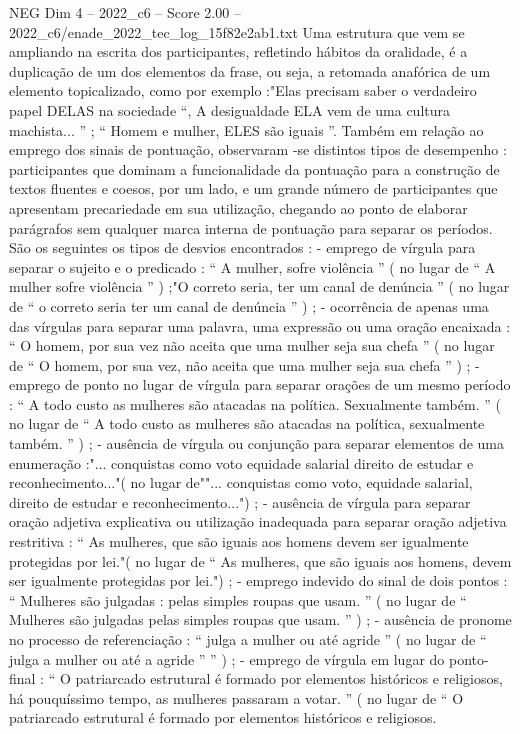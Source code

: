 \begin{textsample}{NEG Dim 4 – 2022\_c6 – Score 2.00 – 2022\_c6/enade\_2022\_tec\_log\_15f82e2ab1.txt}
Uma estrutura que vem se ampliando na escrita dos participantes, refletindo hábitos da oralidade, é a duplicação de um dos elementos da frase, ou seja, a retomada anafórica de um elemento topicalizado, como por exemplo :"Elas precisam saber o verdadeiro papel DELAS na sociedade “, A desigualdade ELA vem de uma cultura machista... ” ; “ Homem e mulher, ELES são iguais ”.
Também em relação ao emprego dos sinais de pontuação, observaram -se distintos tipos de desempenho : participantes que dominam a funcionalidade da pontuação para a construção de textos fluentes e coesos, por um lado, e um grande número de participantes que apresentam precariedade em sua utilização, chegando ao ponto de elaborar parágrafos sem qualquer marca interna de pontuação para separar os períodos.
São os seguintes os tipos de desvios encontrados : - emprego de vírgula para separar o sujeito e o predicado : “ A mulher, sofre violência ” ( no lugar de “ A mulher sofre violência ” ) ;"O correto seria, ter um canal de denúncia ” ( no lugar de “ o correto seria ter um canal de denúncia ” ) ; - ocorrência de apenas uma das vírgulas para separar uma palavra, uma expressão ou uma oração encaixada : “ O homem, por sua vez não aceita que uma mulher seja sua chefa ” ( no lugar de “ O homem, por sua vez, não aceita que uma mulher seja sua chefa ” ) ; - emprego de ponto no lugar de vírgula para separar orações de um mesmo período : “ A todo custo as mulheres são atacadas na política.
Sexualmente também. ” ( no lugar de “ A todo custo as mulheres são atacadas na política, sexualmente também. ” ) ; - ausência de vírgula ou conjunção para separar elementos de uma enumeração :"... conquistas como voto equidade salarial direito de estudar e reconhecimento..."( no lugar de""... conquistas como voto, equidade salarial, direito de estudar e reconhecimento...") ; - ausência de vírgula para separar oração adjetiva explicativa ou utilização inadequada para separar oração adjetiva restritiva : “ As mulheres, que são iguais aos homens devem ser igualmente protegidas por lei."( no lugar de “ As mulheres, que são iguais aos homens, devem ser igualmente protegidas por lei.") ; - emprego indevido do sinal de dois pontos : “ Mulheres são julgadas : pelas simples roupas que usam. ” ( no lugar de “ Mulheres são julgadas pelas simples roupas que usam. ” ) ; - ausência de pronome no processo de referenciação : “ julga a mulher ou até agride ” ( no lugar de “ julga a mulher ou até a agride ” ” ) ; - emprego de vírgula em lugar do ponto-final : “ O patriarcado estrutural é formado por elementos históricos e religiosos, há pouquíssimo tempo, as mulheres passaram a votar. ” ( no lugar de “ O patriarcado estrutural é formado por elementos históricos e religiosos.

\end{textsample}
